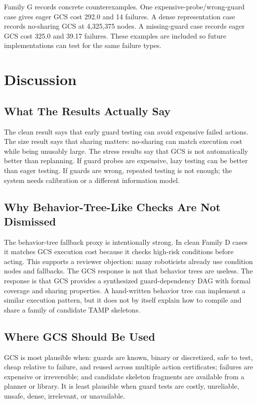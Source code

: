 \documentclass{article}
\begin{document}
Family G records concrete counterexamples. One expensive-probe/wrong-guard case gives eager GCS cost 292.0 and 14 failures. A dense representation case records no-sharing GCS at 4,325,375 nodes. A missing-guard case records eager GCS cost 325.0 and 39.17 failures. These examples are included so future implementations can test for the same failure types.

\begin{table}[t]
\centering
\caption{Claim-to-evidence map generated by the v3 runner.}
\label{tab:claim-evidence}
\small

\end{table}

\section{Discussion}
\subsection{What The Results Actually Say}
The clean result says that early guard testing can avoid expensive failed actions. The size result says that sharing matters: no-sharing can match execution cost while being unusably large. The stress results say that GCS is not automatically better than replanning. If guard probes are expensive, lazy testing can be better than eager testing. If guards are wrong, repeated testing is not enough; the system needs calibration or a different information model.

\subsection{Why Behavior-Tree-Like Checks Are Not Dismissed}
The behavior-tree fallback proxy is intentionally strong. In clean Family D cases it matches GCS execution cost because it checks high-risk conditions before acting. This supports a reviewer objection: many roboticists already use condition nodes and fallbacks. The GCS response is not that behavior trees are useless. The response is that GCS provides a synthesized guard-dependency DAG with formal coverage and sharing properties. A hand-written behavior tree can implement a similar execution pattern, but it does not by itself explain how to compile and share a family of candidate TAMP skeletons.

\subsection{Where GCS Should Be Used}
GCS is most plausible when: guards are known, binary or discretized, safe to test, cheap relative to failure, and reused across multiple action certificates; failures are expensive or irreversible; and candidate skeleton fragments are available from a planner or library. It is least plausible when guard tests are costly, unreliable, unsafe, dense, irrelevant, or unavailable.
\end{document}
